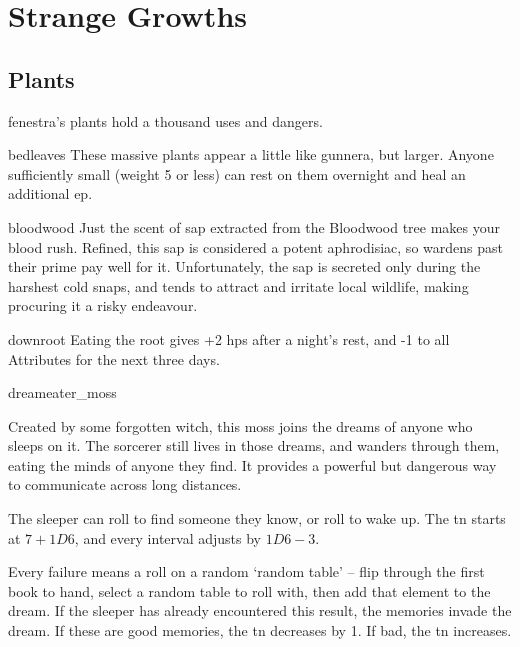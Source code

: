 \chapter{Strange Growths}
\label{growths}

\section{Plants}
\label{plants}

\begin{multicols}{2}
\renewcommand\npcsymbol{\glsentrytext{plant}}

\noindent
\Gls{fenestra}'s plants hold a thousand uses and dangers.

%
  {bedleaves}%
  {These massive plants appear a little like gunnera, but larger.
  Anyone sufficiently small (\gls{weight} 5 or less) can rest on them overnight and heal an additional \gls{ep}.}%

%
  {bloodwood}%
  {Just the scent of sap extracted from the Bloodwood tree makes your blood rush.
  Refined, this sap is considered a potent aphrodisiac, so \glspl{warden} past their prime pay well for it.
  Unfortunately, the sap is secreted only during the harshest cold snaps, 
  and tends to attract and irritate local wildlife, making procuring it a risky endeavour.
  }

%
  {downroot}%
  {Eating the root gives +2 \glspl{hp} after a night's rest, and -1 to all Attributes for the next three days.
  }

%
  {dreameater_moss}%
  {
    Created by some forgotten witch, this moss joins the dreams of anyone who sleeps on it.
    The sorcerer still lives in those dreams, and wanders through them, eating the minds of anyone they find.
    It provides a powerful but dangerous way to communicate across long distances.

    The sleeper can roll  to find someone they know, or roll  to wake up.
    The \gls{tn} starts at $7 + 1D6$, and every \gls{interval} adjusts by $1D6 - 3$.

    Every failure means a roll on a random `random table' -- flip through the first book to hand, select a random table to roll with, then add that element to the dream.
    If the sleeper has already encountered this result, the memories invade the dream.
    If these are good memories, the \gls{tn} decreases by 1.
    If bad, the \gls{tn} increases.
  }


\end{multicols}
